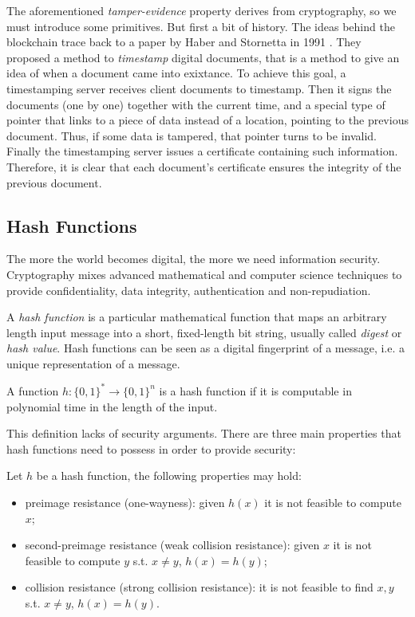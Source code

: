 \newpage
\bigskip
\noindent
The aforementioned \textit{tamper-evidence} property derives from cryptography, so we must introduce some primitives. But first a bit of history. The ideas behind the blockchain trace back to a paper by Haber and Stornetta in 1991 \cite{Haber91howto}. They proposed a method to \textit{timestamp} digital documents, that is a method to give an idea of when a document came into exixtance. To achieve this goal, a timestamping server receives client documents to timestamp. Then it signs the documents (one by one) together with the current time, and a special type of pointer that links to a piece of data instead of a location, pointing to the previous document. Thus, if some data is tampered, that pointer turns to be invalid. Finally the timestamping server issues a certificate containing such information. Therefore, it is clear that each document's certificate ensures the integrity of the previous document.

\subsection{Hash Functions}
\label{sec:hash}
The more the world becomes digital, the more we need information security. Cryptography mixes advanced mathematical and computer science techniques to provide confidentiality, data integrity, authentication and non-repudiation.

\bigskip
\noindent
A \textit{hash function} is a particular mathematical function that maps an arbitrary length input message into a short, fixed-length bit string, usually called \textit{digest} or \textit{hash value}. Hash functions can be seen as a digital fingerprint of a message, i.e. a unique representation of a message.

\begin{mydef}
    \label{def:hash}
	A function $h : \{ 0, 1 \} ^* \rightarrow \{ 0, 1 \} ^n $ is a hash function if it is computable in polynomial time in the length of the input.
\end{mydef}

\bigskip
\noindent
This definition lacks of security arguments. There are three main properties that hash functions need to possess in order to provide security:
\begin{mydef}
	\label{def:hash-prop}
	Let $h$ be a hash function, the following properties may hold:
	\begin{itemize}
		\item preimage resistance (one-wayness): given $h(x)$ it is not feasible to compute $x$;
		\item second-preimage resistance (weak collision resistance): given $x$ it is not feasible to compute $y$ s.t. $x \neq y$, $h(x)=h(y)$;
		\item collision resistance (strong collision resistance): it is not feasible to find $x, y$ s.t. $x \neq y$, $h(x)=h(y)$.
	\end{itemize}
\end{mydef}

